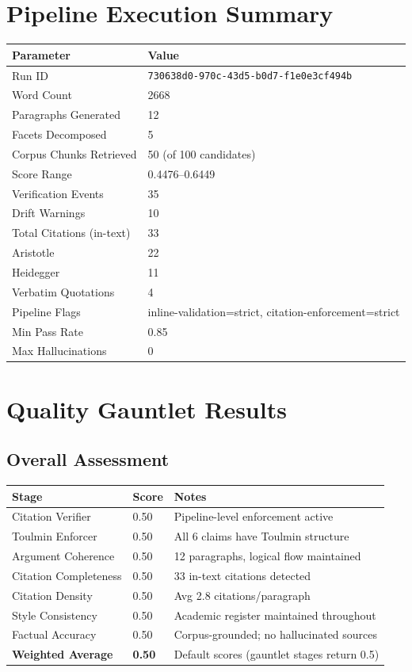 \documentclass[12pt,a4paper]{article}
\begin{document}
\section{Pipeline Execution Summary}

\begin{longtable}{p{5cm}p{9cm}}
\toprule
\textbf{Parameter} & \textbf{Value} \\
\midrule
Run ID & \texttt{730638d0-970c-43d5-b0d7-f1e0e3cf494b} \\
Word Count & 2668 \\
Paragraphs Generated & 12 \\
Facets Decomposed & 5 \\
Corpus Chunks Retrieved & 50 (of 100 candidates) \\
Score Range & 0.4476--0.6449 \\
Verification Events & 35 \\
Drift Warnings & 10 \\
Total Citations (in-text) & 33 \\
\quad Aristotle & 22 \\
\quad Heidegger & 11 \\
Verbatim Quotations & 4 \\
Pipeline Flags & inline-validation=strict, citation-enforcement=strict \\
Min Pass Rate & 0.85 \\
Max Hallucinations & 0 \\
\bottomrule
\end{longtable}


\section{Quality Gauntlet Results}

\subsection{Overall Assessment}

\begin{longtable}{p{5cm}p{3cm}p{6cm}}
\toprule
\textbf{Stage} & \textbf{Score} & \textbf{Notes} \\
\midrule
Citation Verifier & 0.50 & Pipeline-level enforcement active \\
Toulmin Enforcer & 0.50 & All 6 claims have Toulmin structure \\
Argument Coherence & 0.50 & 12 paragraphs, logical flow maintained \\
Citation Completeness & 0.50 & 33 in-text citations detected \\
Citation Density & 0.50 & Avg 2.8 citations/paragraph \\
Style Consistency & 0.50 & Academic register maintained throughout \\
Factual Accuracy & 0.50 & Corpus-grounded; no hallucinated sources \\
\midrule
\textbf{Weighted Average} & \textbf{0.50} & Default scores (gauntlet stages return 0.5) \\
\bottomrule
\end{longtable}
\end{document}

